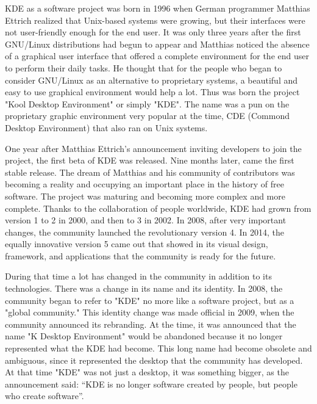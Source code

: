 

\noindent{}KDE as a software project was born in 1996 when German programmer Matthias Ettrich realized that Unix-based systems were growing, but their interfaces were not user-friendly enough for the end user. It was only three years after the first GNU/Linux distributions had begun to appear and Matthias noticed the absence of a graphical user interface that offered a complete environment for the end user to perform their daily tasks. He thought that for the people who began to consider GNU/Linux as an alternative to proprietary systems, a beautiful and easy to use graphical environment would help a lot. Thus was born the project "Kool Desktop Environment" or simply "KDE". The name was a pun on the proprietary graphic environment very popular at the time, CDE (Commond Desktop Environment) that also ran on Unix systems.

One year after Matthias Ettrich's announcement inviting developers to join the project, the first beta of KDE was released. Nine months later, came the first stable release. The dream of Matthias and his community of contributors was becoming a reality and occupying an important place in the history of free software. The project was maturing and becoming more complex and more complete. Thanks to the collaboration of people worldwide, KDE had grown from version 1 to 2 in 2000, and then to 3 in 2002. In 2008, after very important changes, the community launched the revolutionary version 4. In 2014, the equally innovative version 5 came out that showed in its visual design, framework, and applications that the community is ready for the future.

During that time a lot has changed in the community in addition to its technologies. There was a change in its name and its identity. In 2008, the community began to refer to "KDE" no more like a software project, but as a "global community." This identity change was made official in 2009, when the community announced its rebranding. At the time, it was announced that the name "K Desktop Environment" would be abandoned because it no longer represented what the KDE had become. This long name had become obsolete and ambiguous, since it represented the desktop that the community has developed. At that time "KDE" was not just a desktop, it was something bigger, as the announcement said: “KDE is no longer software created by people, but people who create software”. 

